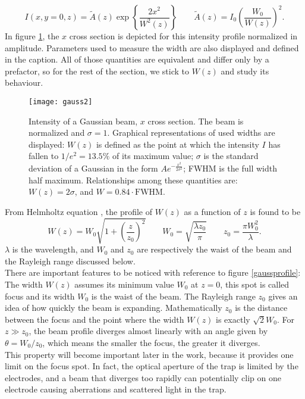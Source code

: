 \begin{equation}
I(x,y=0,z) = \widetilde{A}(z) \exp\left\{\frac{2x^2}{W^2(z)}\right\} \qquad \widetilde{A}(z) = I_0 \left(\frac{W_0}{W(z)}\right)^2  .
\end{equation}
In figure \ref{gauss}, the $x$ cross section is depicted for this intensity profile normalized in amplitude. Parameters used to measure the width are also displayed and defined in the caption. All of those quantities are equivalent and differ only by a prefactor, so for the rest of the section, we stick to $W(z)$ and study its behaviour.
\begin{figure}
\centering
\texttt{[image: gauss2]}
\caption{Intensity of a Gaussian beam, $x$ cross section. The beam is normalized and $\sigma=1$. Graphical representations of used widths are displayed: $W(z)$ is defined as the point at which the intensity $I$ has fallen to $1/e^2 = 13.5\%$ of its maximum value; $\sigma$ is the standard deviation of a Gaussian in the form $Ae^{-\frac{x^2}{2\sigma^2}}$; FWHM is the full width half maximum. Relationships among these quantities are: $W(z) = 2\sigma$, and $W = 0.84\cdot \text{FWHM}$.}
\label{gauss}
\end{figure}
From Helmholtz equation \cite{saleh}, the profile of $W(z)$ as a function of $z$ is found to be
\begin{equation}
\label{waistprofile}
W(z) = W_0 \sqrt{1 + \left(\frac{z}{z_0}\right)^2}\qquad W_0 = \sqrt{\frac{\lambda z_0}{\pi}} \qquad z_0 = \frac{\pi W_0^2}{\lambda}.
\end{equation}
$\lambda$ is the wavelength, and $W_0$ and $z_0$ are respectively the waist of the beam and the Rayleigh range discussed below.\\
There are important features to be noticed with reference to figure \eqref{gaussprofile}:
The width $W(z)$ assumes its minimum value $W_0$ at $z=0$, this spot is called focus and its width $W_0$ is the waist of the beam. The Rayleigh range $z_0$ gives an idea of how quickly the beam is expanding. Mathematically $z_0$ is the distance between the focus and the point where the width $W(z)$ is exactly $\sqrt{2}W_0$.
For $z \gg z_0$, the beam profile diverges almost linearly with an angle given by $\theta = W_0/z_0$, which means the smaller the focus, the greater it diverges.\\
This property will become important later in the work, because it provides one limit on the focus spot. In fact, the optical aperture of the trap is limited by the electrodes, and a beam that diverges too rapidly can potentially clip on one electrode causing aberrations and scattered light in the trap.\\
